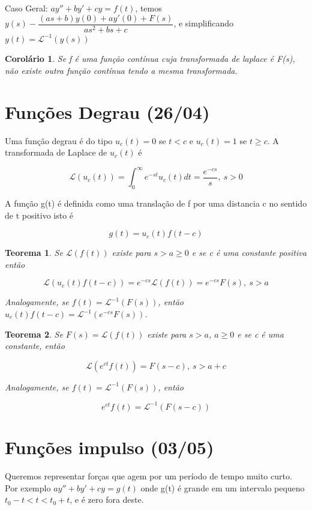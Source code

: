 \documentclass{article}
\newtheorem{theorem}{Teorema}[section]
\newtheorem{corollary}{Corolário}[theorem]
\begin{document}
Caso Geral: $a y'' + b y' + c y = f(t)$, temos $y(s) - \dfrac{(as + b)y(0) + a y'(0) + F(s)}{as^2 + b s + c}$, e simplificando $y(t) = \mathscr{L}^{-1} (y(s))$

\begin{corollary}
    Se f é uma função contínua cuja transformada de laplace é F(s), não existe outra função contínua tendo a mesma transformada. 
\end{corollary}

\section*{Funções Degrau (26/04)}
\label{s12}
Uma função degrau é do tipo $u_c (t) = 0$ se $t < c$ e $u_c (t) = 1$ se $t \geq c$. A transformada de Laplace de $u_c(t)$ é

$$\mathscr{L}(u_c (t)) = \int_0^\infty e^{-s t} u_c(t) d t = \frac{e^{-c s}}{s}, \ s > 0$$

A função g(t) é definida como uma translação de f por uma distancia c no sentido de t positivo isto é 

$$g(t) = u_c(t) f(t-c)$$

\begin{theorem}
    Se $\mathscr{L}(f(t))$ existe para $s > a \geq 0$ e se c é uma constante positiva então
    
    $$\mathscr{L}(u_c(t) f(t - c)) = e^{-cs} \mathscr{L}(f(t)) = e^{-cs} F(s), \ s > a$$
    
    Analogamente, se $f(t) = \mathscr{L}^{-1} (F(s))$, então $u_c(t) f(t-c) = \mathscr{L}^{-1} (e^{-c s} F(s))$.
\end{theorem}

\begin{theorem}
    Se $F(s) = \mathscr{L}(f(t))$ existe para $s > a$, $a \geq 0$ e se c é uma constante, então
    
    $$\mathscr{L}(e^{ct} f(t)) = F(s-c), \ s > a + c$$
    
    Analogamente, se $f(t) = \mathscr{L}^{-1} (F(s))$, então
    
    $$e^{c t} f(t) = \mathscr{L}^{-1} (F(s - c))$$
\end{theorem}

\section*{Funções impulso (03/05)}
\label{s13}
Queremos representar forças que agem por um período de tempo muito curto. Por exemplo $ay'' + by' + c y = g(t)$ onde g(t) é grande em um intervalo pequeno $t_0 - t < t < t_0 + t$, e é zero fora deste. 
\end{document}
